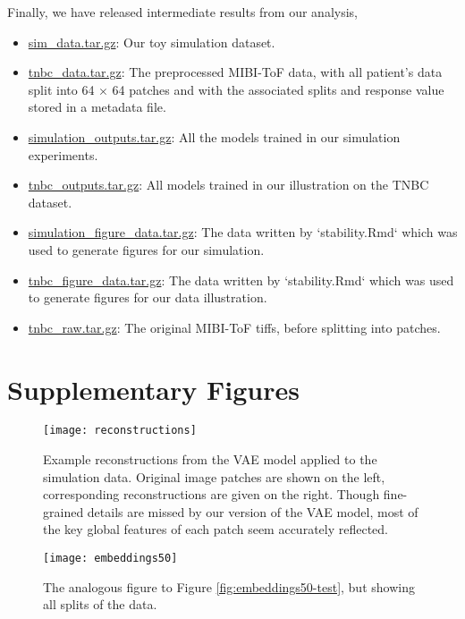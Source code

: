 Finally, we have released intermediate results from our analysis,

\begin{itemize}
\item
  \href{https://drive.google.com/file/d/1v_Ndux1Rmk2q1ul5Vv5srgI1JQ17Vx0n/view?usp=sharing}{sim\_data.tar.gz}:
  Our toy simulation dataset.
\item \href{https://drive.google.com/file/d/1KMG5yrty8UEPhrR0Y7hIZrtwWuP_y-cm/view?usp=sharing}{tnbc\_data.tar.gz}: The preprocessed MIBI-ToF data, with all
  patient's data split into 64 $\times$ 64 patches and with the associated
  splits and response value stored in a metadata file.
\item \href{https://drive.google.com/file/d/1QVmyqYQCe8C04rAyBQxXuZYuaiYleopx/view?usp=sharing}{simulation\_outputs.tar.gz}: All the models trained in our
  simulation experiments.
\item \href{https://drive.google.com/file/d/1DmzObBWCzVzDNZ1DxcUWgyIoZmC4H8gD/view?usp=sharing}{tnbc\_outputs.tar.gz}: All models trained in our illustration on
  the TNBC dataset.
\item \href{}{simulation\_figure\_data.tar.gz}: The data written by
  `stability.Rmd` which was used to generate figures for our simulation.
\item \href{}{tnbc\_figure\_data.tar.gz}: The data written by `stability.Rmd`
  which was used to generate figures for our data illustration.
\item \href{https://drive.google.com/file/d/1c-ZPs9RbzkY9FzUnCCVJc8syt5dpj-4Y/view?usp=sharing}{tnbc\_raw.tar.gz}:
  The original MIBI-ToF tiffs, before splitting into patches.
\end{itemize}

\section{Supplementary Figures}

\begin{figure}
\texttt{[image: reconstructions]}
\caption{Example reconstructions from the VAE model applied to the simulation
  data. Original image patches are shown on the left, corresponding
  reconstructions are given on the right. Though fine-grained details are missed
  by our version of the VAE model, most of the key global features of each patch
  seem accurately reflected.}
\label{fig:reconstructions}
\end{figure}

\begin{figure}
  \centering
  \texttt{[image: embeddings50]}
  \caption{The analogous figure to Figure \ref{fig:embeddings50-test}, but
    showing all splits of the data.}
  \label{fig:embeddings50}
\end{figure}


